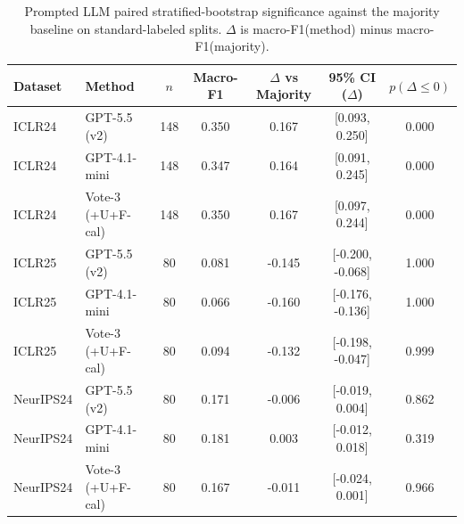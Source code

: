\begin{table}[t]
\centering
\scriptsize
\setlength{\tabcolsep}{3pt}
\begin{tabular}{llccccc}
\toprule
Dataset & Method & $n$ & Macro-F1 & $\Delta$ vs Majority & 95\% CI ($\Delta$) & $p(\Delta\le0)$ \\
\midrule
ICLR24 & GPT-5.5 (v2) & 148 & 0.350 & 0.167 & [0.093, 0.250] & 0.000 \\
ICLR24 & GPT-4.1-mini & 148 & 0.347 & 0.164 & [0.091, 0.245] & 0.000 \\
ICLR24 & Vote-3 (+U+F-cal) & 148 & 0.350 & 0.167 & [0.097, 0.244] & 0.000 \\
ICLR25 & GPT-5.5 (v2) & 80 & 0.081 & -0.145 & [-0.200, -0.068] & 1.000 \\
ICLR25 & GPT-4.1-mini & 80 & 0.066 & -0.160 & [-0.176, -0.136] & 1.000 \\
ICLR25 & Vote-3 (+U+F-cal) & 80 & 0.094 & -0.132 & [-0.198, -0.047] & 0.999 \\
NeurIPS24 & GPT-5.5 (v2) & 80 & 0.171 & -0.006 & [-0.019, 0.004] & 0.862 \\
NeurIPS24 & GPT-4.1-mini & 80 & 0.181 & 0.003 & [-0.012, 0.018] & 0.319 \\
NeurIPS24 & Vote-3 (+U+F-cal) & 80 & 0.167 & -0.011 & [-0.024, 0.001] & 0.966 \\
\bottomrule
\end{tabular}
\caption{Prompted LLM paired stratified-bootstrap significance against the majority baseline on standard-labeled splits. $\Delta$ is macro-F1(method) minus macro-F1(majority).}
\label{tab:prompted-llm-significance}
\end{table}
